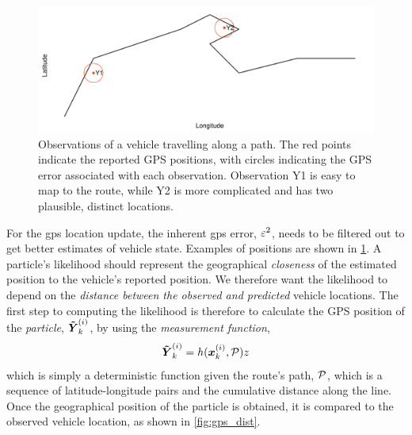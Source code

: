 \begin{knitrout}\small
{}\color{fgcolor}\begin{figure}
\includegraphics[width=\maxwidth]{figure/lhood_obs-1} \caption[Observations of a vehicle travelling along a path]{Observations of a vehicle travelling along a path. The red points indicate the reported GPS positions, with circles indicating the GPS error associated with each observation. Observation Y1 is easy to map to the route, while Y2 is more complicated and has two plausible, distinct locations.}\label{fig:lhood_obs}
\end{figure}


\end{knitrout}





For the \gls{gps} location update, the inherent \gls{gps} error, $\varepsilon^2$, needs to be filtered out to get better estimates of vehicle state. Examples of positions are shown in \cref{fig:lhood_obs}. A particle's likelihood should represent the geographical \emph{closeness} of the estimated position to the vehicle's reported position. We therefore want the likelihood to depend on the \emph{distance between the observed and predicted} vehicle locations. The first step to computing the likelihood is therefore
to calculate the GPS position of the \emph{particle}, $\boldsymbol{\tilde Y}^{(i)}_k$, by using the \emph{measurement function},
\begin{equation}
\label{eq:pf_measurement_fun}
\boldsymbol{\tilde Y}^{(i)}_k = h(\boldsymbol x^{(i)}_k, \mathcal{P})z
\end{equation}
which is simply a deterministic function given the route's path, $\mathcal{P}$, which is a sequence of latitude-longitude pairs and the cumulative distance along the line. Once the geographical position of the particle is obtained, it is compared to the observed vehicle location, as shown in \cref{fig:gps_dist}.

